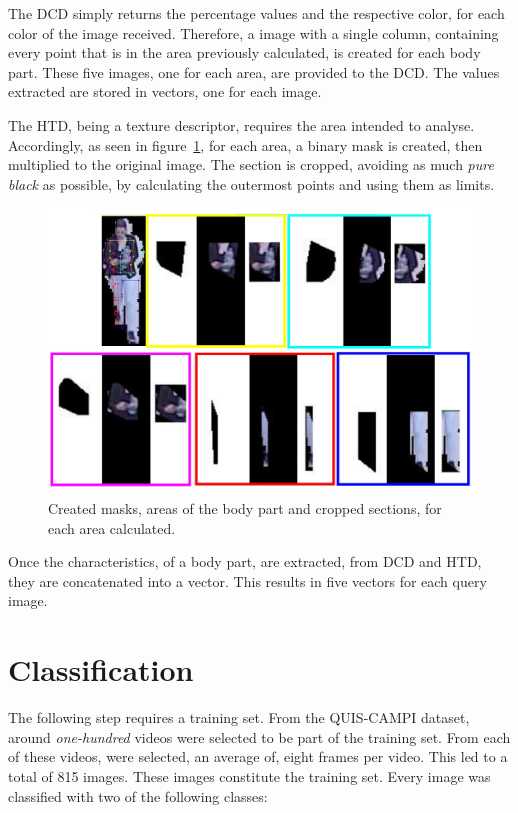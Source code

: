 \documentclass[titlepage,12pt,a4paper,times]{book}
\begin{document}
The \ac{DCD} simply returns the percentage values and the respective color, for
each color of the image received. Therefore, a image with a single column,
containing every point that is in the area previously calculated, is created
for each body part. These five images, one for each area, are provided to
the \ac{DCD}. The values extracted are stored in vectors, one for each
image.

The \ac{HTD}, being a texture descriptor, requires the area intended to
analyse.  Accordingly, as seen in figure~\ref{fig:mac}, for each area, a binary
mask is created, then multiplied to the original image. The section is cropped,
avoiding as much \emph{pure black} as possible, by calculating the outermost
points and using them as limits.

\begin{figure}[!h]
\centering
\includegraphics[scale=0.3]{images/3_4_fig1.jpg}
\caption{Created masks, areas of the body part and cropped sections, for each
area calculated.}
\label{fig:mac}
\end{figure}
\FloatBarrierc

Once the characteristics, of a body part, are extracted, from \ac{DCD} and
\ac{HTD}, they are concatenated into a vector. This results in five vectors for
each query image.

\section{Classification}
\label{chap3:sec:ann}
The following step requires a training set. From the QUIS-CAMPI dataset, around
\emph{one-hundred} videos were selected to be part of the training set. From
each of these videos, were selected, an average of, eight frames per video. This
led to a total of 815 images. These images constitute the training set. Every
image was classified with two of the following classes:
\end{document}
